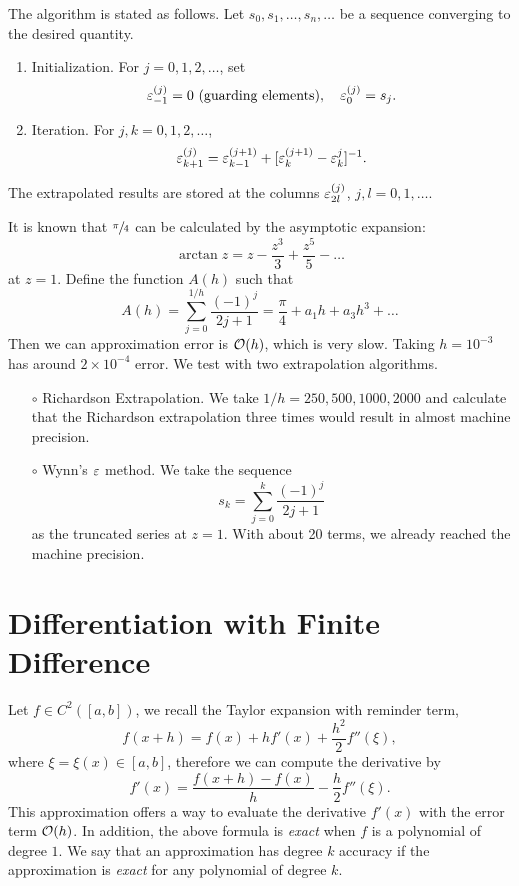 The algorithm is stated as follows. Let $s_0, s_1, \dots, s_n,\dots$ be a sequence converging to the desired quantity.
\begin{enumerate}
    \item Initialization. For $j = 0, 1, 2,\dots$, set 
    $$\varepsilon_{-1}^{(j)} = 0 \text{ (guarding elements)}, \quad \varepsilon_{0}^{(j)} = s_j.$$
    \item Iteration. For $j,k = 0,1,2,\dots$, 
    $$\varepsilon_{k+1}^{(j)} = \varepsilon_{k-1}^{(j+1)} + [\varepsilon_{k}^{(j+1)} - \varepsilon_{k}^{j}]^{-1}.$$
\end{enumerate}
The extrapolated results are stored at the columns $\varepsilon_{2l}^{(j)}$, $j, l=0,1, \dots$.
\begin{example}
    It is known that $\sfrac{\pi}{4}$ can be calculated by the asymptotic expansion:
    \begin{equation}
        \arctan z = z - \frac{z^3}{3} + \frac{z^5}{5} - \dots 
    \end{equation}
    at $z = 1$. Define the function $A(h)$ such that 
    \begin{equation}
        A(h)= \sum_{j=0}^{1/h} \frac{(-1)^j}{2 j + 1} = \frac{\pi}{4} + a_1 h + a_3 h^3 + \dots
    \end{equation}
    Then we can approximation error is $\mathcal O(h)$, which is very slow. Taking $h=10^{-3}$ has around $2\times 10^{-4}$ error.  We test with two extrapolation algorithms.
    \begin{enumerate}
        \item [$\circ$] Richardson Extrapolation. We take $1/h = 250, 500, 1000, 2000$ and calculate that the Richardson extrapolation three times would result in almost machine precision.
        \item [$\circ$] Wynn's $\varepsilon$ method. We take the sequence 
        $$s_k = \sum_{j=0}^k \frac{(-1)^j}{2 j + 1}$$
        as the truncated series at $z = 1$. With about 20 terms, we already reached the machine precision.
    \end{enumerate}

\end{example}
\section{Differentiation with Finite Difference}
Let $f\in C^2([a, b])$, we recall the Taylor expansion with reminder term, 
\begin{equation}
    f(x + h) = f(x) + h f'(x) + \frac{h^2}{2} f''(\xi),
\end{equation}
where $\xi = \xi(x)\in [a, b]$, therefore we can compute the derivative by 
\begin{equation}
    f'(x)  = \frac{f(x + h) - f(x)}{h} - \frac{h}{2} f''(\xi).
\end{equation}
This approximation offers a way to evaluate the derivative $f'(x)$ with the error term $\mathcal O(h)$. In addition, the above formula is \emph{exact} when $f$ is a polynomial of degree $1$. We say that an approximation has degree $k$ accuracy if the approximation is \emph{exact} for any polynomial of degree $k$. 

